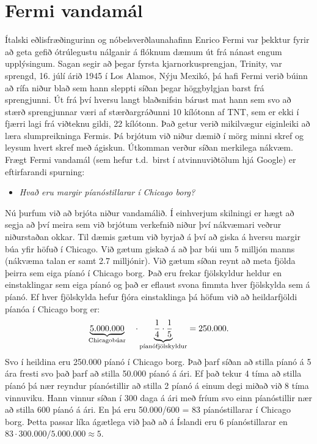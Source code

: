 \section{Fermi vandamál}

Ítalski eðlisfræðingurinn og nóbelsverðlaunahafinn Enrico Fermi var þekktur fyrir að geta gefið ótrúlegustu nálganir á flóknum dæmum út frá nánast engum upplýsingum. Sagan segir að þegar fyrsta kjarnorkusprengjan, Trinity, var sprengd, 16. júlí árið 1945 í Los Alamos, Nýju Mexikó, þá hafi Fermi verið búinn að rífa niður blað sem hann sleppti síðan þegar höggbylgjan barst frá sprengjunni. Út frá því hversu langt blaðsnifsin bárust mat hann sem svo að stærð sprengjunnar væri af stærðargráðunni 10 kílótonn af TNT, sem er ekki í fjærri lagi frá viðteknu gildi, 22 kílótonn. Það getur verið mikilvægur eiginleiki að læra slumpreikninga Fermis. Þá brjótum við niður dæmið í mörg minni skref og leysum hvert skref með ágiskun. Útkomman verður síðan merkilega nákvæm. 
Frægt Fermi vandamál (sem hefur t.d.~birst í atvinnuviðtölum hjá Google) er eftirfarandi spurning:

\begin{itemize}
    \item \textit{Hvað eru margir píanóstillarar í Chicago borg?}
\end{itemize}

Nú þurfum við að brjóta niður vandamálið. Í einhverjum skilningi er hægt að segja að því meira sem við brjótum verkefnið niður því nákvæmari veðrur niðurstaðan okkar. Til dæmis gætum við byrjað á því að giska á hversu margir búa yfir höfuð í Chicago. Við gætum giskað á að þar búi um 5 milljón manns (nákvæma talan er samt \SI{2.7}{} milljónir). Við gætum síðan reynt að meta fjölda þeirra sem eiga píanó 
í Chicago borg. Það eru frekar fjölskyldur heldur en einstaklingar sem eiga píanó og það er eflaust svona fimmta hver fjölskylda sem á píanó. Ef hver fjölskylda hefur fjóra einstaklinga þá höfum við að heildarfjöldi píanóa í Chicago borg er:
\begin{align*}
    \underbrace{5.000.000}_\textrm{$\text{Chicagobúar}$} \hspace{0.35cm} \cdot \underbrace{\frac{1}{4} \cdot \frac{1}{5}}_\textrm{$\text{píanófjölskyldur}$} = 250.000.
\end{align*}
Svo í heildina eru 250.000 píanó í Chicago borg. Það þarf síðan að stilla píanó á 5 ára fresti svo það þarf að stilla 50.000 píanó á ári. Ef það tekur 4 tíma að stilla píanó þá nær reyndur píanóstillir að stilla 2 píanó á einum degi miðað við 8 tíma vinnuviku. Hann vinnur síðan í 300 daga á ári með fríum svo einn píanóstillir nær að stilla 600 píanó á ári. En þá eru 50.000/600 = 83 píanóstillarar í Chicago borg. Þetta passar líka ágætlega við það að á Íslandi eru 6 píanóstillarar en $83 \cdot 300.000/5.000.000 \approx 5$.

